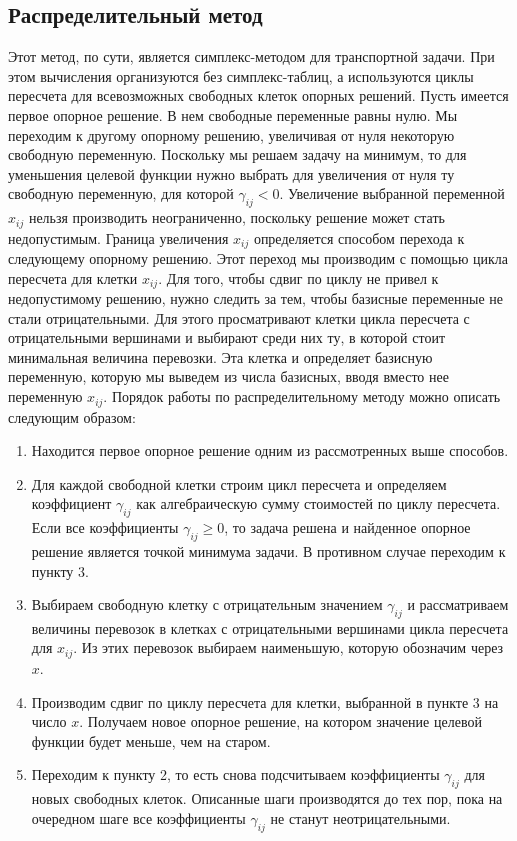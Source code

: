 \subsection{Распределительный метод}

Этот метод, по сути, является симплекс-методом для транспортной задачи. При этом вычисления организуются без симплекс-таблиц, а используются циклы пересчета для всевозможных свободных клеток опорных решений. Пусть имеется первое опорное решение. В нем свободные переменные равны нулю. Мы переходим к другому опорному решению, увеличивая от нуля некоторую свободную переменную. Поскольку мы решаем задачу на минимум, то для уменьшения целевой функции нужно выбрать для увеличения от нуля ту свободную переменную, для которой $\gamma_{ij} < 0$. Увеличение выбранной переменной $x_{ij}$ нельзя производить неограниченно, поскольку решение может стать недопустимым. Граница увеличения $x_{ij}$ определяется способом перехода к следующему опорному решению. Этот переход мы производим с помощью цикла пересчета для клетки $x_{ij}$. Для того, чтобы сдвиг по циклу не привел к недопустимому решению, нужно следить за тем, чтобы базисные переменные не стали отрицательными. Для этого просматривают клетки цикла пересчета с отрицательными вершинами и выбирают среди них ту, в которой стоит минимальная величина перевозки. Эта клетка и определяет базисную переменную, которую мы выведем из числа базисных, вводя вместо нее переменную $x_{ij}$. Порядок работы по распределительному методу можно описать следующим образом:

\begin{enumerate}
\item Находится первое опорное решение одним из рассмотренных выше способов.
\item Для каждой свободной клетки строим цикл пересчета и определяем коэффициент $\gamma_{ij}$ как алгебраическую сумму стоимостей по циклу пересчета. Если все коэффициенты $\gamma_{ij} \ge 0$, то задача решена и найденное опорное решение является точкой минимума задачи. В противном случае переходим к пункту 3.
\item Выбираем свободную клетку с отрицательным значением $\gamma_{ij}$ и рассматриваем величины перевозок в клетках с отрицательными вершинами цикла пересчета для $x_{ij}$. Из этих перевозок выбираем наименьшую, которую обозначим через $x$.
\item Производим сдвиг по циклу пересчета для клетки, выбранной в пункте 3 на число $x$. Получаем новое опорное решение, на котором значение целевой функции будет меньше, чем на старом.
\item Переходим к пункту 2, то есть снова подсчитываем коэффициенты $\gamma_{ij}$ для новых свободных клеток. Описанные шаги производятся до тех пор, пока на очередном шаге все коэффициенты $\gamma_{ij}$ не станут неотрицательными.
\end{enumerate}
